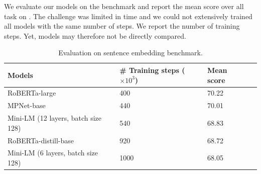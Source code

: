 We evaluate our models on the benchmark and report the mean score over all task on . The challenge was limited in time and we could not extensively trained all models with the same number of steps. We report the number of training steps. Yet, models may therefore not be directly compared.

\begin{table}[!htb]
\centering
\small
\begin{tabularx}{\textwidth}{@{}lYYY@{} }
\toprule
\textbf{Models} & \textbf{\# Training steps} ($\times 10^3$) & \textbf{Mean score} \\
\midrule
\midrule 
RoBERTa-large & 400 & 70.22 \\
MPNet-base & 440 & 70.01 \\ %
Mini-LM (12 layers, batch size 128) & 540 & 68.83 \\ %
RoBERTa-distill-base & 920 & 68.72 \\
Mini-LM (6 layers, batch size 128) & \num{1000} & 68.05 \\ %
\bottomrule
\end{tabularx}
\caption{Evaluation on sentence embedding benchmark.}
\end{table}

